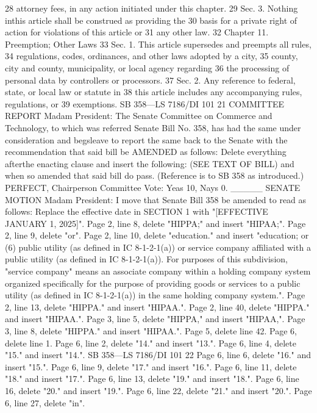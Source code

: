 28 attorney fees, in any action initiated under this chapter.
29 Sec. 3. Nothing inthis article shall be construed as providing the
30 basis for a private right of action for violations of this article or
31 any other law.
32 Chapter 11. Preemption; Other Laws
33 Sec. 1. This article supersedes and preempts all rules,
34 regulations, codes, ordinances, and other laws adopted by a city,
35 county, city and county, municipality, or local agency regarding
36 the processing of personal data by controllers or processors.
37 Sec. 2. Any reference to federal, state, or local law or statute in
38 this article includes any accompanying rules, regulations, or
39 exemptions.
SB 358—LS 7186/DI 101
21
COMMITTEE REPORT
Madam President: The Senate Committee on Commerce and
Technology, to which was referred Senate Bill No. 358, has had the
same under consideration and begsleave to report the same back to the
Senate with the recommendation that said bill be AMENDED as
follows:
Delete everything afterthe enacting clause and insert the following:
(SEE TEXT OF BILL)
and when so amended that said bill do pass.
(Reference is to SB 358 as introduced.)
PERFECT, Chairperson
Committee Vote: Yeas 10, Nays 0.
_____
SENATE MOTION
Madam President: I move that Senate Bill 358 be amended to read
as follows:
Replace the effective date in SECTION 1 with "[EFFECTIVE
JANUARY 1, 2025]".
Page 2, line 8, delete "HIPPA;" and insert "HIPAA;".
Page 2, line 9, delete "or".
Page 2, line 10, delete "education." and insert "education; or
(6) public utility (as defined in IC 8-1-2-1(a)) or service
company affiliated with a public utility (as defined in
IC 8-1-2-1(a)). For purposes of this subdivision, "service
company" means an associate company within a holding
company system organized specifically for the purpose of
providing goods or services to a public utility (as defined in
IC 8-1-2-1(a)) in the same holding company system.".
Page 2, line 13, delete "HIPPA." and insert "HIPAA.".
Page 2, line 40, delete "HIPPA." and insert "HIPAA.".
Page 3, line 5, delete "HIPPA," and insert "HIPAA,".
Page 3, line 8, delete "HIPPA." and insert "HIPAA.".
Page 5, delete line 42.
Page 6, delete line 1.
Page 6, line 2, delete "14." and insert "13.".
Page 6, line 4, delete "15." and insert "14.".
SB 358—LS 7186/DI 101
22
Page 6, line 6, delete "16." and insert "15.".
Page 6, line 9, delete "17." and insert "16.".
Page 6, line 11, delete "18." and insert "17.".
Page 6, line 13, delete "19." and insert "18.".
Page 6, line 16, delete "20." and insert "19.".
Page 6, line 22, delete "21." and insert "20.".
Page 6, line 27, delete "in".
